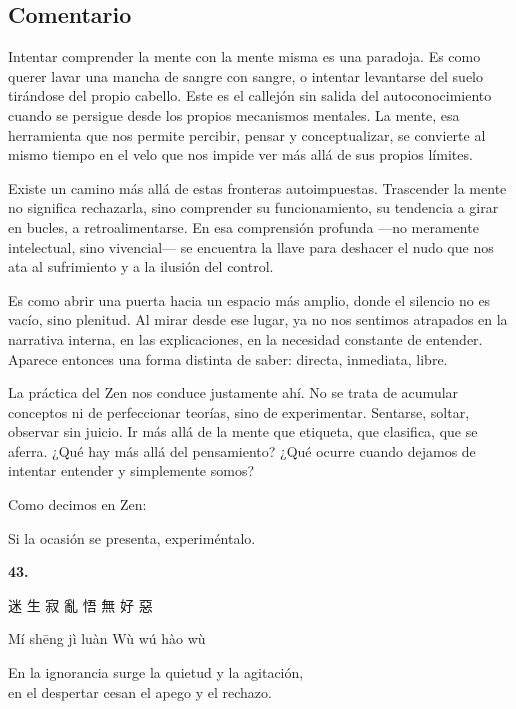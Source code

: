 \documentclass[
  a5paperpaper,
]{article}
\begin{document}
\hfill\break

\hypertarget{comentario-41}{%
\subsection{Comentario}\label{comentario-41}}

Intentar comprender la mente con la mente misma es una paradoja. Es como
querer lavar una mancha de sangre con sangre, o intentar levantarse del
suelo tirándose del propio cabello. Este es el callejón sin salida del
autoconocimiento cuando se persigue desde los propios mecanismos
mentales. La mente, esa herramienta que nos permite percibir, pensar y
conceptualizar, se convierte al mismo tiempo en el velo que nos impide
ver más allá de sus propios límites.

Existe un camino más allá de estas fronteras autoimpuestas. Trascender
la mente no significa rechazarla, sino comprender su funcionamiento, su
tendencia a girar en bucles, a retroalimentarse. En esa comprensión
profunda ---no meramente intelectual, sino vivencial--- se encuentra la
llave para deshacer el nudo que nos ata al sufrimiento y a la ilusión
del control.

Es como abrir una puerta hacia un espacio más amplio, donde el silencio
no es vacío, sino plenitud. Al mirar desde ese lugar, ya no nos sentimos
atrapados en la narrativa interna, en las explicaciones, en la necesidad
constante de entender. Aparece entonces una forma distinta de saber:
directa, inmediata, libre.

La práctica del Zen nos conduce justamente ahí. No se trata de acumular
conceptos ni de perfeccionar teorías, sino de experimentar. Sentarse,
soltar, observar sin juicio. Ir más allá de la mente que etiqueta, que
clasifica, que se aferra. ¿Qué hay más allá del pensamiento? ¿Qué ocurre
cuando dejamos de intentar entender y simplemente somos?

Como decimos en Zen:

Si la ocasión se presenta, experiméntalo.

\hfill\break

\hypertarget{03}{}
\begin{verseblock}

\newpage

\begin{center}\textbf{43.}\end{center}

迷 生 寂 亂 悟 無 好 惡

Mí shēng jì luàn Wù wú hào wù

En la ignorancia surge la quietud y la agitación,\\
en el despertar cesan el apego y el rechazo.

\end{verseblock}
\end{document}
